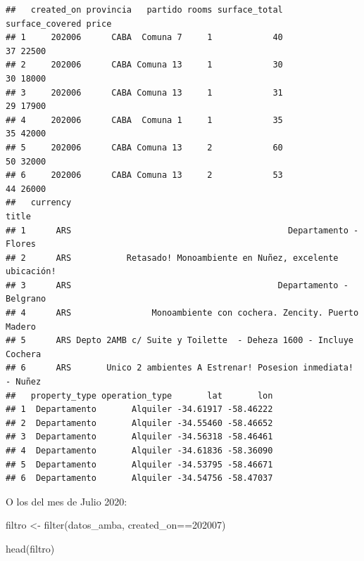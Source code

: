 \documentclass[
  spanish,
]{book}
\newenvironment{Shaded}{\begin{snugshade}}{\end{snugshade}}
\newcommand{\DecValTok}[1]{\textcolor[rgb]{0.00,0.00,0.81}{#1}}
\newcommand{\FunctionTok}[1]{\textcolor[rgb]{0.00,0.00,0.00}{#1}}
\newcommand{\NormalTok}[1]{#1}
\newcommand{\OtherTok}[1]{\textcolor[rgb]{0.56,0.35,0.01}{#1}}
\newcommand{\SpecialCharTok}[1]{\textcolor[rgb]{0.00,0.00,0.00}{#1}}
\begin{document}
\begin{verbatim}
##   created_on provincia   partido rooms surface_total surface_covered price
## 1     202006      CABA  Comuna 7     1            40              37 22500
## 2     202006      CABA Comuna 13     1            30              30 18000
## 3     202006      CABA Comuna 13     1            31              29 17900
## 4     202006      CABA  Comuna 1     1            35              35 42000
## 5     202006      CABA Comuna 13     2            60              50 32000
## 6     202006      CABA Comuna 13     2            53              44 26000
##   currency                                                           title
## 1      ARS                                           Departamento - Flores
## 2      ARS           Retasado! Monoambiente en Nuñez, excelente ubicación!
## 3      ARS                                         Departamento - Belgrano
## 4      ARS                Monoambiente con cochera. Zencity. Puerto Madero
## 5      ARS Depto 2AMB c/ Suite y Toilette  - Deheza 1600 - Incluye Cochera
## 6      ARS       Unico 2 ambientes A Estrenar! Posesion inmediata! - Nuñez
##   property_type operation_type       lat       lon
## 1  Departamento       Alquiler -34.61917 -58.46222
## 2  Departamento       Alquiler -34.55460 -58.46652
## 3  Departamento       Alquiler -34.56318 -58.46461
## 4  Departamento       Alquiler -34.61836 -58.36090
## 5  Departamento       Alquiler -34.53795 -58.46671
## 6  Departamento       Alquiler -34.54756 -58.47037
\end{verbatim}

O los del mes de Julio 2020:

\begin{Shaded}
\begin{Highlighting}[]
\NormalTok{filtro }\OtherTok{\textless{}{-}} \FunctionTok{filter}\NormalTok{(datos\_amba, created\_on}\SpecialCharTok{==}\DecValTok{202007}\NormalTok{)}

\FunctionTok{head}\NormalTok{(filtro)}
\end{Highlighting}
\end{Shaded}
\end{document}
